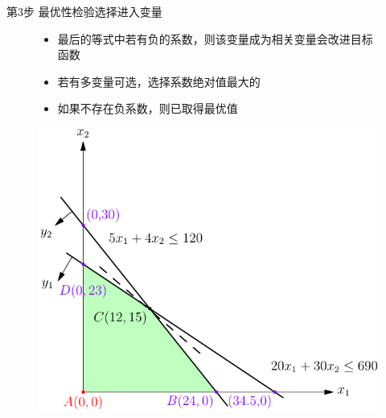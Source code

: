 \documentclass[UTF8]{ctexbeamer}
\begin{document}
\begin{frame}{第3步 最优性检验选择进入变量}
  \begin{figure}
    \begin{minipage}{.5\linewidth}
      \begin{itemize}
      \item 最后的等式中若有负的系数，则该变量成为相关变量会改进目标函数
      \item 若有多变量可选，选择系数绝对值最大的
      \item 如果不存在负系数，则已取得最优值
      \end{itemize}
    \end{minipage}%
    \begin{minipage}{.5\linewidth}
      \includegraphics[width=\textwidth{}]{simplex-improve.pdf}
    \end{minipage}
  \end{figure}  
\end{frame}
\end{document}
